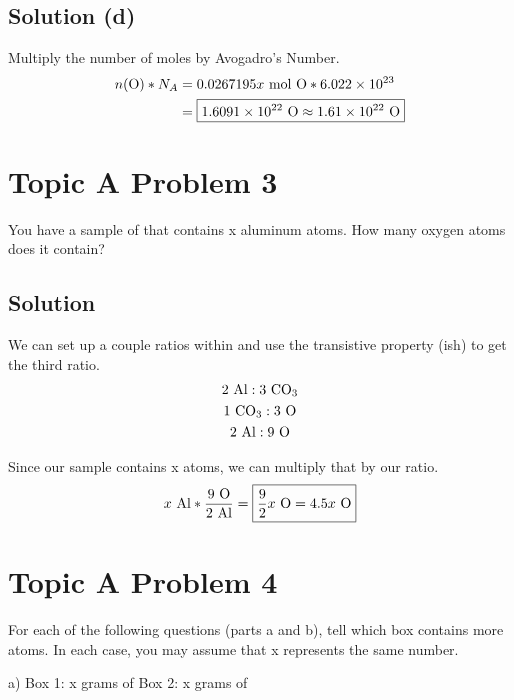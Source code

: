 \documentclass[10pt]{article}
\begin{document}
        \subsection{Solution (d)}
            Multiply the number of moles by Avogadro's Number.
            \begin{align}
                n(\ce{O}) * N_A &=  0.0267195x\ \unit{\mole}\ \ce{O} * 6.022 \times 10^{23}\\
                    &=  \boxed{1.6091 \times 10^{22}\ \ce{O}
                    \approx 1.61 \times 10^{22}\ \ce{O}}
            \end{align}

    \pagebreak
    \section{Topic A Problem 3}
        You have a sample of  that contains x aluminum atoms. 
        How many oxygen atoms does it contain?

        \subsection{Solution}
            We can set up a couple ratios within  and use the transistive property (ish) to get the third ratio.
            \begin{gather}
                2\ \ce{Al} : 3\ \ce{CO3}\\
                1\ \ce{CO3} : 3\ \ce{O}\\
                2\ \ce{Al} : 9\ \ce{O}
            \end{gather}

            Since our sample contains x  atoms, we can multiply that by our ratio.
            \begin{equation}
                x\ \ce{Al} * \frac{9\ \ce{O}}{2\ \ce{Al}} = \boxed{\frac{9}{2}x\ \ce{O} = 4.5x\ \ce{O}}
            \end{equation}

    \pagebreak
    \section{Topic A Problem 4}
        For each of the following questions (parts a and b), tell which box contains more atoms. 
        In each case, you may assume that x represents the same number.

        a) Box 1: x grams of     Box 2: x grams of 
\end{document}

